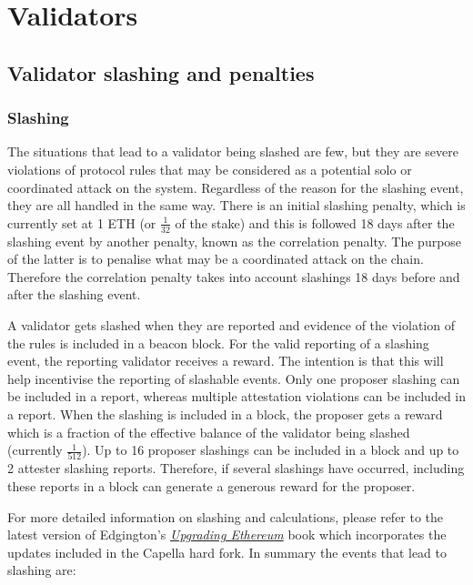 \documentclass{article}
\begin{document}
\section{Validators}
\label{sec:validators}
\subsection{Validator slashing and penalties}
\label{slashing} \subsubsection*{Slashing} The situations that lead to a
validator being slashed are few, but they are severe violations of protocol
rules that may be considered as a potential solo or coordinated attack on the
system. Regardless of the reason for the slashing event, they are all handled
in the same way. There is an initial slashing penalty, which is currently set
at 1 ETH (or $\frac{1}{32}$ of the stake) and this is followed 18 days after
the slashing event by another penalty, known as the correlation penalty. The
purpose of the latter is to penalise what may be a coordinated attack on the
chain. Therefore the correlation penalty takes into account slashings 18 days
before and after the slashing event. 

A validator gets slashed when they are reported and evidence of the violation
of the rules is included in a beacon block. For the valid reporting of a
slashing event, the reporting validator receives a reward. The intention is
that this will help incentivise the reporting of slashable events. Only one
proposer slashing can be included in a report, whereas multiple attestation
violations can be included in a report. When the slashing is included in a
block, the proposer gets a reward which is a fraction of the effective balance
of the validator being slashed (currently $\frac{1}{512}$). Up to 16 proposer
slashings can be included in a block and up to 2 attester slashing reports. 
Therefore, if several slashings have occurred, including these reports in a
block can generate a generous reward for the proposer. 

For more detailed information on slashing and calculations, please refer to the 
latest version of Edgington's
\href{https://eth2book.info/capella/part2/incentives/slashing/}{\textit{Upgrading Ethereum}}
book \cite{Edgington2023}  which incorporates the updates included in the 
Capella hard fork. In summary the events that lead to slashing are:
\end{document}
